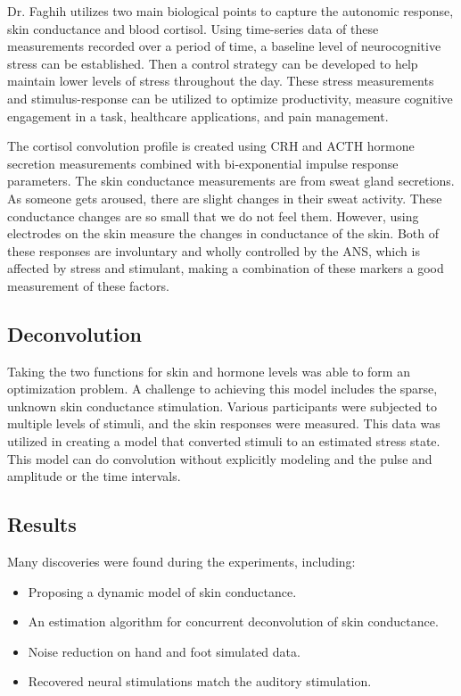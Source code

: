 \documentclass[journal,onecolumn]{IEEEtran}
\begin{document}
Dr. Faghih utilizes two main biological points to capture the autonomic response, skin conductance and blood cortisol. Using time-series data of these measurements recorded over a period of time, a baseline level of neurocognitive stress can be established. Then a control strategy can be developed to help maintain lower levels of stress throughout the day. These stress measurements and stimulus-response can be utilized to optimize productivity, measure cognitive engagement in a task, healthcare applications, and pain management. 

The cortisol convolution profile is created using CRH and ACTH hormone secretion measurements combined with bi-exponential impulse response parameters. The skin conductance measurements are from sweat gland secretions. As someone gets aroused, there are slight changes in their sweat activity. These conductance changes are so small that we do not feel them. However, using electrodes on the skin measure the changes in conductance of the skin. Both of these responses are involuntary and wholly controlled by the ANS, which is affected by stress and stimulant, making a combination of these markers a good measurement of these factors. 

\subsection{Deconvolution}

Taking the two functions for skin and hormone levels was able to form an optimization problem. A challenge to achieving this model includes the sparse, unknown skin conductance stimulation. Various participants were subjected to multiple levels of stimuli, and the skin responses were measured. This data was utilized in creating a model that converted stimuli to an estimated stress state. This model can do convolution without explicitly modeling and the pulse and amplitude or the time intervals. 

\subsection{Results}

Many discoveries were found during the experiments, including:

\begin{itemize}
  \item Proposing a dynamic model of skin conductance.
  \item An estimation algorithm for concurrent deconvolution of skin conductance.
  \item Noise reduction on hand and foot simulated data.
  \item Recovered neural stimulations match the auditory stimulation.
\end{itemize}
\end{document}
